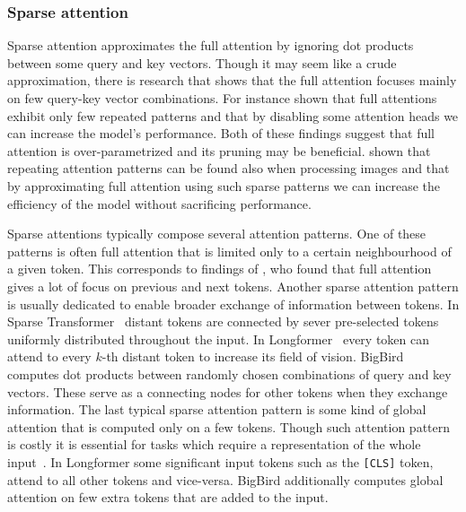 \subsubsection{Sparse attention}


Sparse attention approximates the full attention by ignoring dot products between
some query and key vectors. Though it may seem like a crude approximation, there
is research that shows that the full attention focuses mainly on few query-key
vector combinations. For instance \cite{kovaleva2019revealing} shown that full
attentions exhibit only few repeated patterns and that by disabling some
attention heads we can increase the model's performance. Both of these findings
suggest that full attention is over-parametrized and its pruning may be
beneficial. \cite{child2019generating} shown that repeating attention patterns
can be found also when processing images and that by approximating full
attention using such sparse patterns we can increase the efficiency of the model
without sacrificing performance.

Sparse attentions typically compose several attention patterns. One of these
patterns is often full attention that is limited only to a certain neighbourhood
of a given token. This corresponds to findings of \cite{clark2019does}, who
found that full attention gives a lot of focus on previous and next tokens.
Another sparse attention pattern is usually dedicated to enable broader exchange
of information between tokens. In Sparse Transformer~\citep{child2019generating}
distant tokens are connected by sever pre-selected tokens uniformly distributed
throughout the input. In Longformer~\citep{beltagy2020longformer} every token
can attend to every $k$-th distant token to increase its field of vision.
BigBird~\citep{zaheer2020big} computes dot products between randomly chosen
combinations of query and key vectors. These serve as a connecting nodes for
other tokens when they exchange information. The last typical sparse attention
pattern is some kind of global attention that is computed only on a few tokens.
Though such attention pattern is costly it is essential for tasks which require
a representation of the whole input~\citep{beltagy2020longformer}. In Longformer
some significant input tokens such as the \texttt{[CLS]} token, attend to all
other tokens and vice-versa. BigBird additionally computes global attention on
few extra tokens that are added to the input.

